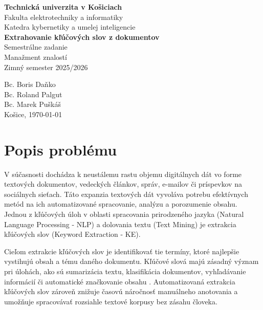 \documentclass[a4paper,12pt]{article}
\begin{document}
\begin{titlepage}
    \centering
    {\Large \textbf{Technická univerzita v Košiciach}}\\[0.3em]
    {\large Fakulta elektrotechniky a informatiky}\\[0.3em]
    {\large Katedra kybernetiky a umelej inteligencie}\\[2cm]
    
    \vspace*{\fill}
    {\huge \textbf{Extrahovanie kľúčových slov z dokumentov}}\\[1cm]
    {\Large Semestrálne zadanie}\\[0.3em]
    {\large Manažment znalostí}\\
    {\large Zimný semester 2025/2026}\\
    \vspace*{\fill}
    
    \begin{flushright}
        {\large Bc. Boris Daňko}\\
        {\large Bc. Roland Palgut}\\
        {\large Bc. Marek Puškáš}\\[1cm]
        {\large Košice, \today}
    \end{flushright}
\end{titlepage}


\tableofcontents
\newpage


\section{Popis problému}

V súčasnosti dochádza k neustálemu rastu objemu digitálnych dát vo forme textových dokumentov, vedeckých článkov, správ, e-mailov či príspevkov na sociálnych sieťach. Táto expanzia textových dát vyvoláva potrebu efektívnych metód na ich automatizované spracovanie, analýzu a porozumenie obsahu. Jednou z kľúčových úloh v oblasti spracovania prirodzeného jazyka (Natural Language Processing - NLP) a dolovania textu (Text Mining) je extrakcia kľúčových slov (Keyword Extraction - KE). 

Cieľom extrakcie kľúčových slov je identifikovať tie termíny, ktoré najlepšie vystihujú obsah a tému daného dokumentu. Kľúčové slová majú zásadný význam pri úlohách, ako sú sumarizácia textu, klasifikácia dokumentov, vyhľadávanie informácií či automatické značkovanie obsahu \cite{rose2010automatic}. Automatizovaná extrakcia kľúčových slov zároveň znižuje časovú náročnosť manuálneho anotovania a umožňuje spracovávať rozsiahle textové korpusy bez zásahu človeka.
\end{document}
